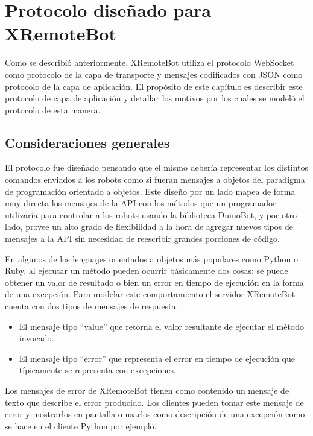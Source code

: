 \section{Protocolo diseñado para XRemoteBot}

Como se describió anteriormente, XRemoteBot utiliza el protocolo WebSocket como
protocolo de la capa de transporte y mensajes codificados con JSON como
protocolo de la capa de aplicación. El propósito de este capítulo es describir
este protocolo de capa de aplicación y detallar los motivos por los cuales
se modeló el protocolo de esta manera.

\subsection{Consideraciones generales}


El protocolo fue diseñado pensando que el mismo debería representar los
distintos comandos enviados a los robots como si fueran mensajes a objetos
del paradigma de programación orientado a objetos. Este diseño por un lado
mapea de forma muy directa los mensajes de la API
con los métodos que un programador utilizaría para controlar a los robots
usando la biblioteca DuinoBot,  y por otro lado, provee un alto grado de
flexibilidad a la hora de agregar nuevos tipos de mensajes a la API sin
necesidad de reescribir grandes porciones de código.

En algunos de los lenguajes orientados a objetos más populares como Python
o Ruby, al ejecutar un método pueden ocurrir básicamente dos cosas:
se puede obtener un valor de resultado o bien un error
en tiempo de ejecución en la forma de una excepción. Para modelar este
comportamiento el servidor XRemoteBot cuenta con dos tipos de mensajes
de respuesta:

\begin{itemize}
    \item El mensaje tipo ``value'' que retorna el valor resultante de
        ejecutar el método invocado.
    \item El mensaje tipo ``error'' que representa el error en tiempo
        de ejecución que típicamente se representa con excepciones.
\end{itemize}

Los mensajes de error de XRemoteBot tienen como contenido
un mensaje de texto que describe el error producido. Los clientes
pueden tomar este mensaje
de error y mostrarlos en pantalla o usarlos como descripción de una
excepción como se hace en el cliente Python por ejemplo.

